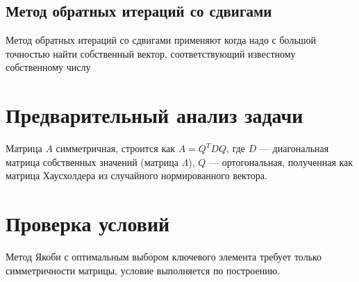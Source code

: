 \documentclass[11pt,a4paper]{article}
\renewcommand\;{\hspace{1cm}}
\begin{document}
\subsection{Метод обратных итераций со сдвигами}
Метод обратных итераций со сдвигами применяют когда надо с большой точностью найти собственный вектор, соответствующий известному собственному числу
\section{Предварительный анализ задачи}
Матрица $A$ симметричная, строится как $A = Q^{T}DQ$, где $D$ --- диагональная матрица собственных значений (матрица $\Lambda$), $Q$ --- ортогональная, полученная как матрица Хаусхолдера из случайного нормированного вектора.
\section{Проверка условий}
Метод Якоби с оптимальным выбором ключевого элемента требует только симметричности матрицы, условие выполняется по построению.
\end{document}

